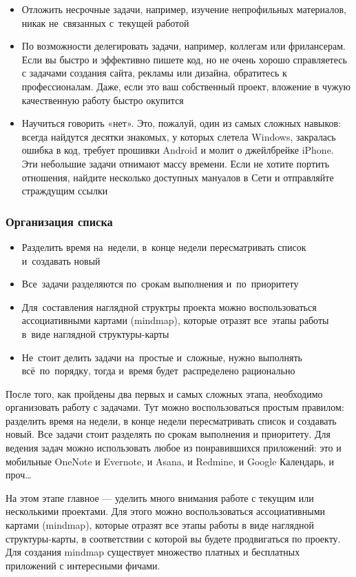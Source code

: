 \documentclass{../industrial-development}
\begin{document}
\begin{itemize}
\item Отложить несрочные задачи, например, изучение непрофильных материалов, никак не~связанных с~текущей работой
\item По возможности делегировать задачи, например, коллегам или фрилансерам. Если вы быстро и эффективно пишете код, но не очень хорошо справляетесь с задачами создания сайта, рекламы или дизайна, обратитесь к профессионалам. Даже, если это ваш собственный проект, вложение в чужую качественную работу быстро окупится
\item Научиться говорить «нет». Это, пожалуй, один из самых сложных навыков: всегда найдутся десятки знакомых, у которых слетела Windows, закралась ошибка в код, требует прошивки Android и молит о джейлбрейке iPhone. Эти небольшие задачи отнимают массу времени. Если не хотите портить отношения, найдите несколько доступных мануалов в Сети и отправляйте страждущим ссылки~\cite{GTDHabr}
\end{itemize}

\begin{frame} \frametitle{Организация списка}
  \begin{itemize}
  \item Разделить время на~недели, в~конце недели пересматривать список и~создавать новый
  \item Все~задачи разделяются по~срокам выполнения и~по~приоритету
  \item Для~составления наглядной структры проекта можно воспользоваться ассоциативными картами (mindmap), которые отразят все~этапы работы в~виде наглядной структуры-карты
  \item Не~стоит делить задачи на~простые и~сложные, нужно выполнять всё~по~порядку, тогда и~время будет~распределено рационально
  \end{itemize}
\end{frame}

\lecturenotes

После того, как пройдены два первых и самых сложных этапа, необходимо организовать работу с задачами. Тут можно воспользоваться простым правилом: разделить время на недели, в конце недели пересматривать список и создавать новый. Все задачи стоит разделять по срокам выполнения и приоритету. Для ведения задач можно использовать любое из понравившихся приложений: это и мобильные OneNote и Evernote, и Asana, и Redmine, и Google Календарь, и проч…

На этом этапе главное — уделить много внимания работе с текущим или несколькими проектами. Для этого можно воспользоваться ассоциативными картами (mindmap), которые отразят все этапы работы в виде наглядной структуры-карты, в соответствии с которой вы будете продвигаться по проекту. Для создания mindmap существует множество платных и бесплатных приложений с интересными фичами.
\end{document}
